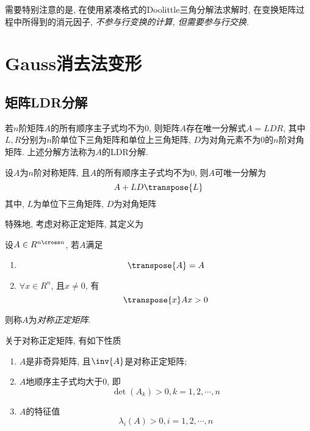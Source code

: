 需要特别注意的是, 在使用紧凑格式的Doolittle三角分解法求解时, 在变换矩阵过程中所得到的消元因子, \emph{不参与行变换的计算, 但需要参与行交换}. 

\section{Gauss消去法变形}

\subsection{矩阵LDR分解}

\begin{theorem}
    若$n$阶矩阵$A$的所有顺序主子式均不为0, 则矩阵$A$存在唯一分解式$A=LDR$, 其中$L, R$分别为$n$阶单位下三角矩阵和单位上三角矩阵, $D$为对角元素不为0的$n$阶对角矩阵. 上述分解方法称为$A$的LDR分解.
\end{theorem}

\begin{corollary}
    设$A$为$n$阶对称矩阵, 且$A$的所有顺序主子式均不为0, 则$A$可唯一分解为
    \begin{equation*}
        A+LD\transpose{L}
    \end{equation*}
    其中, $L$为单位下三角矩阵, $D$为对角矩阵
\end{corollary}

特殊地, 考虑对称正定矩阵, 其定义为
\begin{definition}
    设$A\in R^{n\cross n}$, 若$A$满足
    \begin{enumerate}
        \item \begin{equation*}
            \transpose{A}=A
        \end{equation*}

        \item $\forall x\in R^n$, 且$x\ne 0$, 有
        \begin{equation*}
            \transpose{x}Ax>0
        \end{equation*}
    \end{enumerate}
    则称$A$为\emph{对称正定矩阵}.
\end{definition}

关于对称正定矩阵, 有如下性质
\begin{enumerate}
    \item $A$是非奇异矩阵, 且$\inv{A}$是对称正定矩阵;
    \item $A$地顺序主子式均大于0, 即
    \begin{equation*}
        \det(A_k)>0, k=1,2,\cdots,n
    \end{equation*}
    \item $A$的特征值
    \begin{equation*}
        \lambda_i(A)>0, i=1,2,\cdots,n
    \end{equation*}
\end{enumerate}

